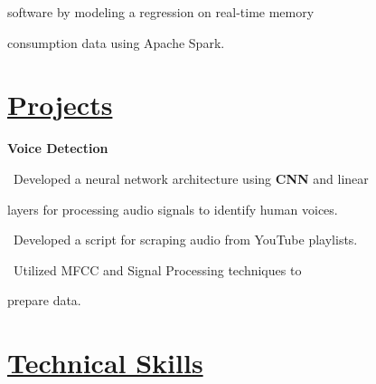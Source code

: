 \documentclass{article}
\begin{document}
\begin{minipage}[t][0pt]{8in\linewidth}
\begin{minipage}[t]{0.45\textwidth\hspace{0in}}
\begin{minipage}[t]{3.75in\textwidth\hspace{0in}}
            \hspace{1.6em} software by modeling a regression on real-time memory 
            
            \hspace{1.6em} consumption data using Apache Spark.
        \end{minipage}

        \vspace{-1.5em}
        \section{\underline{Projects}}
        \begin{minipage}[t]{3.75in\textwidth\hspace{0in}}

            \vspace{-1em}
            \mdseries\bfseries{Voice Detection}            
            
            \vspace{0em}
            \small\mdseries
            \hspace{1em}\textasteriskcentered \, \frenchspacing\mdseries\textrm{Developed a neural network architecture using \textbf{CNN} and linear} 
            
            \frenchspacing\hspace{2em}layers for processing audio signals to identify human voices.

            \vspace{0.6em}
            \hspace{1em}\textasteriskcentered \, \frenchspacing\mdseries\textrm{Developed a script for scraping audio from YouTube playlists.}
            
            \vspace{0.6em}
            \hspace{1em}\textasteriskcentered \, \frenchspacing\mdseries\textrm{Utilized MFCC and Signal Processing techniques to} 
            
            \hspace{1.7em} prepare data.

        \end{minipage}

\end{minipage}
    \begin{minipage}[t]{3.1in\linewidth\hspace{2.8em}}
    \section{\underline{Technical Skills}}
    \vspace{-0.7em}

\end{minipage}
\end{minipage}
\end{document}
